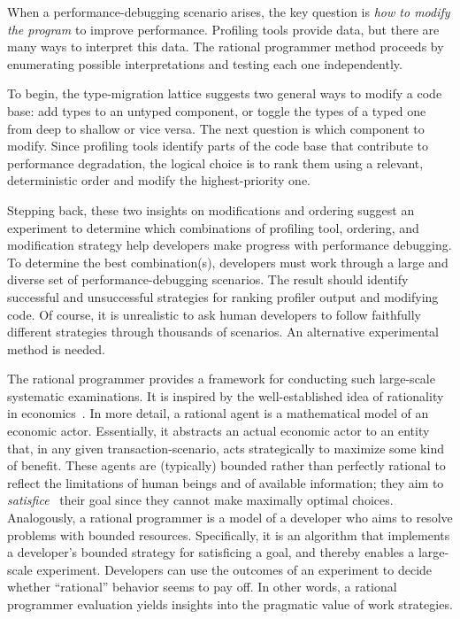 
When a performance-debugging scenario arises, the key question is \emph{how
to modify the program} to improve performance.
Profiling tools provide data, but there are many ways to interpret this data.
The rational programmer method proceeds by enumerating possible
interpretations and testing each one independently.

To begin, the type-migration lattice suggests two general ways to modify a
code base:
add types to an untyped component, or toggle the types of a typed one
from deep to shallow or vice versa.
The next question is which component to modify.
Since profiling tools identify parts of the code base that contribute to performance
degradation, the logical choice is to rank them using a relevant, deterministic
order and modify the highest-priority one.

Stepping back, these two insights on modifications and ordering suggest
an experiment to determine which combinations of profiling tool,
ordering, and modification strategy help developers make progress with
performance debugging.
To determine the best combination(s), developers must work through a
large and diverse set of performance-debugging scenarios.
The result should identify successful and unsuccessful strategies for ranking
profiler output and modifying code.
Of course, it is unrealistic to ask human developers to follow faithfully different
strategies through thousands
of scenarios. An alternative experimental method is needed.

The rational programmer provides a framework for conducting such
large-scale systematic examinations.
It is inspired by the well-established idea of rationality in
economics~\cite{mill1874essays, henrich2001search}.  In more detail, a
rational agent is a mathematical model of an economic actor. Essentially, it
abstracts an actual economic actor to an entity that, in any given
transaction-scenario, acts strategically to maximize some kind of benefit.
These agents are (typically) bounded rather than perfectly rational
to reflect the limitations of human beings and of available information;
they aim to \emph{satisfice}~\cite{hs:satisfice} their goal since
they cannot make maximally optimal choices.
Analogously, a rational programmer is a model of a developer who aims to
resolve problems with bounded resources.
Specifically, it is an algorithm that implements a developer's bounded
strategy for {satisficing} a goal, and thereby enables a large-scale
experiment.
Developers can use the outcomes of an experiment to decide whether
``rational'' behavior seems to pay off.
In other words, a rational programmer evaluation yields insights into the
pragmatic value of work strategies.

